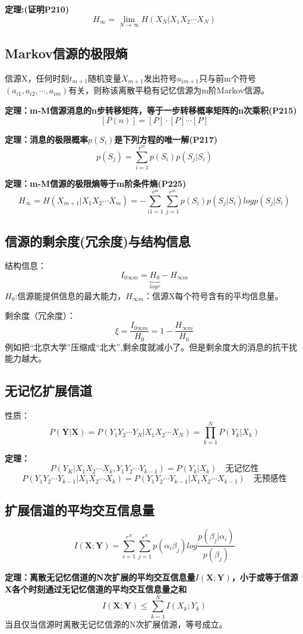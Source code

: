 \documentclass[UTF8]{ctexart} %
\begin{document}
			\textbf{定理:(证明P210)}
			\[H_\infty = \lim_{N\rightarrow\infty}H(X_N|X_1X_2\cdots X_N)\]
		\subsection{Markov信源的极限熵}	
			信源X，任何时刻$t_{m+1}$随机变量$X_{m+1}$发出符号$a_{im+1}$只与前m个符号$(a_{i1},a_{i2},\cdots,a_{im})$有关，则称该离散平稳有记忆信源为m阶Markov信源。
			
			\textbf{定理：m-M信源消息的n步转移矩阵，等于一步转移概率矩阵的n次乘积(P215)}
			\[[P(n)] = [P]\cdot[P]\cdots[P]\]
			
			\textbf{定理：消息的极限概率$p(S_i)$是下列方程的唯一解(P217)}
			\[p(S_j) = \sum_{i=1}^{r^m}p(S_i)p(S_j|S_i)\]
			
			\textbf{定理：m-M信源的极限熵等于m阶条件熵(P225)}
			\[H_{\infty} = H(X_{m+1}|X_1X_2\cdots X_m) = -\sum_{i1=1}^{r^m}\sum_{j=1}^{r^m}p(S_i)p(S_j|S_i)logp(S_j|S_i)\]
			
		\subsection{信源的剩余度(冗余度)与结构信息}
			结构信息：
			\[I_{0\infty m} = \underbrace{H_0}_{logr}-H_{\infty m}\]
			$H_0$:信源能提供信息的最大能力，$H_{\infty m}$：信源X每个符号含有的平均信息量。
			
			剩余度（冗余度）：
			\[\xi = \frac{I_{0\infty m}}{H_0} = 1-\frac{H_{\infty m}}{H_0}\]
			例如把“北京大学”压缩成“北大”,剩余度就减小了。但是剩余度大的消息的抗干扰能力越大。
			
		\subsection{无记忆扩展信道}
			性质：
			\[P(\bm{Y}|\bm{X}) = P(Y_1Y_2\cdots Y_N|X_1X_2\cdots X_N) = \prod_{k=1}^NP(Y_k|X_k)\]	
			
			\textbf{定理：}
			\[P(Y_K|X_1X_2\cdots X_k,Y_1Y_2\cdots Y_{k-1} )=P(Y_k|X_k)\quad\text{无记忆性}\]
			\[P(Y_1Y_2\cdots Y_{k-1} |X_1X_2\cdots X_k)=P(Y_1Y_2\cdots Y_{k-1} |X_1X_2\cdots X_{k-1})\quad\text{无预感性}\]
			
		\subsection{扩展信道的平均交互信息量}
			\[I(\bm{X;Y}) = \sum_{i=1}^{r^N}\sum_{j=1}^{s^N}p(\alpha_i\beta_j)log\frac{p(\beta_j|\alpha_i)}{p(\beta_j)}\]
			
			\textbf{定理：离散无记忆信道的N次扩展的平均交互信息量$I(\bm{X;Y})$，小于或等于信源X各个时刻通过无记忆信道的平均交互信息量之和}
				\[I(\bm{X;Y})\leq\sum_{k=1}^{N}I(X_k;Y_k)\]
			当且仅当信源时离散无记忆信源的N次扩展信源，等号成立。
\end{document}
